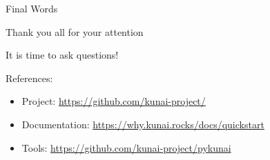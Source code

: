 \documentclass[10pt,aspectratio=169, colorlinks=true, linkcolor=circlBlue]{beamer}
\begin{document}
\begin{frame}{Final Words}
	\begin{center}
		\large
		Thank you all for your attention

		It is time to ask questions!
	\end{center}

	\begin{block}{References:}
		\protect\hypertarget{references}{}
		\begin{itemize}

			\item
			      Project: \url{https://github.com/kunai-project/}\\
			\item
			      Documentation: \url{https://why.kunai.rocks/docs/quickstart}
			\item
			      Tools: \url{https://github.com/kunai-project/pykunai}
		\end{itemize}
	\end{block}
\end{frame}
\end{document}
